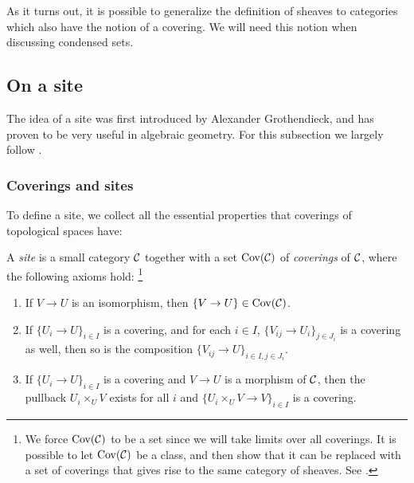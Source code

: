 \documentclass{article}
\DeclareMathOperator{\Cov}{Cov}
\begin{document}
As it turns out, it is possible to generalize
the definition of sheaves to categories which
also have the notion of a covering. We will
need this notion when discussing condensed sets.
\subsection{On a site}

The idea of a site was first introduced by
Alexander Grothendieck, and has proven to be
very useful in algebraic geometry.
For this subsection we largely follow
\cite[\href{https://stacks.math.columbia.edu/tag/00UZ}{Tag 00UZ}]{stacks-project}.

\subsubsection{Coverings and sites}

To define a site, we collect all the essential
properties that coverings of topological spaces have:
\begin{definition}
    A \emph{site} is a small category $\mathcal{C}$ together
    with a set $\Cov(\mcC)$ of \emph{coverings} of
    $\mathcal{C}$, where the following axioms hold:
    \footnote{We force $\Cov(\mcC)$ to be a set since we will take limits
        over all coverings. It is possible to let $\Cov(\mcC)$ be a class,
        and then show that it can be replaced with a set of coverings
        that gives rise to the same category of sheaves.
        See \cite[\href{https://stacks.math.columbia.edu/tag/00VI}{Tag 00VI}]{stacks-project}.}
    \begin{enumerate}
        \item If $V \to U$ is an isomorphism, then $\{V \to U\}\in \Cov(\mcC)$.
        \item If $\{U_i \to U\}_{i\in I}$ is a covering, and for each $i\in I$,
              $\{V_{ij} \to U_i\}_{j \in J_i}$ is a covering as well, then so is the
              composition $\{V_{ij} \to U\}_{i\in I, j\in J_i}$.
        \item If $\{U_i \to U\}_{i\in I}$ is a covering and $V \to U$ is a morphism
              of $\mathcal{C}$, then the pullback $U_i\times_U V$ exists for all $i$
              and $\{U_i\times_U V \to V\}_{i\in I}$ is a covering.
    \end{enumerate}
\end{definition}
\end{document}
